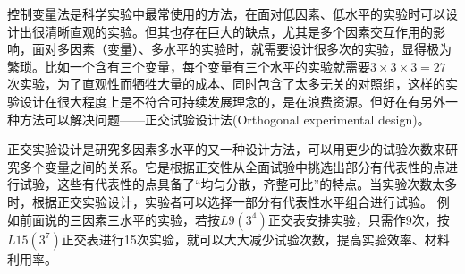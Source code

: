 控制变量法是科学实验中最常使用的方法，在面对低因素、低水平的实验时可以设计出很清晰直观的实验。但其也存在巨大的缺点，尤其是多个因素交互作用的影响，面对多因素（变量）、多水平的实验时，就需要设计很多次的实验，显得极为繁琐。比如一个含有三个变量，每个变量有三个水平的实验就需要$ 3\times 3 \times 3=27$次实验，为了直观性而牺牲大量的成本、同时包含了太多无关的对照组，这样的实验设计在很大程度上是不符合可持续发展理念的，是在浪费资源。但好在有另外一种方法可以解决问题——正交试验设计法(Orthogonal experimental design)。

正交实验设计是研究多因素多水平的又一种设计方法，可以用更少的试验次数来研究多个变量之间的关系。它是根据正交性从全面试验中挑选出部分有代表性的点进行试验，这些有代表性的点具备了“均匀分散，齐整可比”的特点\cite{wangxueshen}。当实验次数太多时，根据正交实验设计，实验者可以选择一部分有代表性水平组合进行试验。 例如前面说的三因素三水平的实验，若按$ L9(3^4) $正交表安排实验，只需作9次，按$ L15(3^7) $正交表进行15次实验，就可以大大减少试验次数，提高实验效率、材料利用率。


